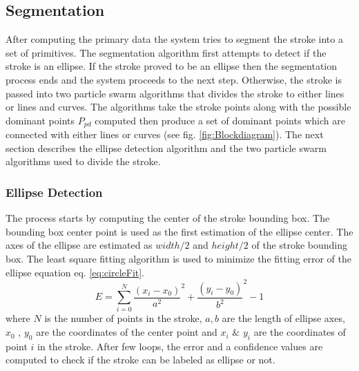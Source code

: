 \documentclass[a4paper,10pt]{IEEEconf}
\begin{document}
\subsection{Segmentation}
\label{seg}
After computing the primary data the system tries to segment the stroke into a set of primitives. The segmentation algorithm first attempts to detect if the stroke is an ellipse. If the stroke proved to be an ellipse then the segmentation process ends and the system proceeds to the next step. Otherwise, the stroke is passed into two particle swarm algorithms that divides the stroke to either lines or lines and curves. The algorithms take the stroke points along with the possible dominant points $P_{pd}$ computed then produce a set of dominant points which are connected with either lines or curves (see fig. \ref{fig:Blockdiagram}). The next section describes the ellipse detection algorithm and the two particle swarm algorithms used to divide the stroke.\\
\subsubsection{Ellipse Detection} 
The process starts by computing the center of the stroke bounding box. The bounding box center point is used as the first estimation of the ellipse center. The axes of the ellipse are estimated as $width/2$ and $height/2$ of the stroke bounding box. The least square fitting algorithm is used to minimize the fitting error of the ellipse equation eq. \ref{eq:circleFit}.
\begin{equation}
E = \sum\limits_{i = 0}^N {\frac{{(x_i - x_0 )}}{{a^2 }}^2  + \frac{{(y_i - y_0 )}}{{b^2 }}^2  - 1} 
\label{eq:circleFit}
\end{equation} where $N$ is the number of points in the stroke, $a,b$ are the length of ellipse axes, $x_0$ , $y_0$ are the coordinates of the center point and $x_i$ \& $y_i$ are the coordinates of point $i$ in the stroke. After few loops, the error and a confidence values  are computed to check if the stroke can be labeled as ellipse or not.\\ %
\end{document}
